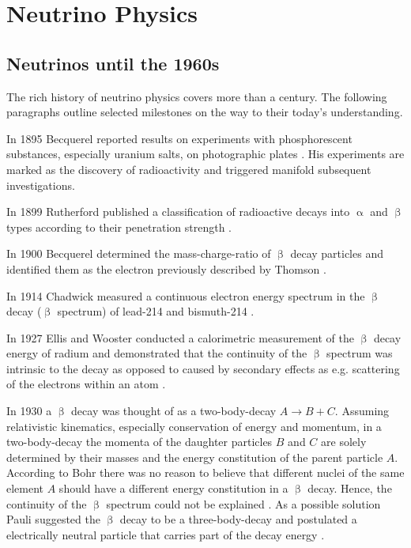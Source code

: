 
\chapter{Neutrino Physics}
    
    \section{Neutrinos until the 1960s}
    The rich history of neutrino physics covers more than a century. The following paragraphs outline selected milestones on the way to their today's understanding.
    
    In 1895 Becquerel reported results on experiments with phosphorescent substances, especially uranium salts, on photographic plates \cite{Becquerel:1}. His experiments are marked as the discovery of radioactivity and triggered manifold subsequent investigations.
    
    In 1899 Rutherford published a classification of radioactive decays into $\upalpha$ and $\upbeta$ types according to their penetration strength \cite{Rutherford:1}.
    
    In 1900 Becquerel determined the mass-charge-ratio of $\upbeta$ decay particles and identified them as the electron previously described by Thomson \cite{Becquerel:2} \cite{Thomson:1}.
    
    In 1914 Chadwick measured a continuous electron energy spectrum in the $\upbeta$ decay ($\upbeta$ spectrum) of lead-214 and bismuth-214 \cite{Chadwick:1}.
    
    In 1927 Ellis and Wooster conducted a calorimetric measurement of the $\upbeta$ decay energy of radium and demonstrated that the continuity of the $\upbeta$ spectrum was intrinsic to the decay as opposed to caused by secondary effects as e.g. scattering of the electrons within an atom \cite{Ellis:1}.
    
    In 1930 a $\upbeta$ decay was thought of as a two-body-decay $A \rightarrow B + C$. Assuming relativistic kinematics, especially conservation of energy and momentum, in a two-body-decay the momenta of the daughter particles $B$ and $C$ are solely determined by their masses and the energy constitution of the parent particle $A$. According to Bohr there was no reason to believe that different nuclei of the same element $A$ should have a different energy constitution in a $\upbeta$ decay. Hence, the continuity of the $\upbeta$ spectrum could not be explained \cite{Bohr:1}. As a possible solution Pauli suggested the $\upbeta$ decay to be a three-body-decay and postulated a electrically neutral particle that carries part of the decay energy \cite{Pauli1930}.
    
